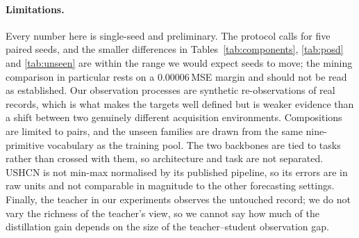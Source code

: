 \paragraph{Limitations.}
Every number here is single-seed and preliminary. The protocol calls for five paired seeds, and the smaller
differences in Tables~\ref{tab:components}, \ref{tab:posd} and \ref{tab:unseen} are within the range we would
expect seeds to move; the mining comparison in particular rests on a $0.00006$\,MSE margin and should not be read
as established. Our observation processes are synthetic re-observations of real records, which is what makes the
targets well defined but is weaker evidence than a shift between two genuinely different acquisition environments.
Compositions are limited to pairs, and the unseen families are drawn from the same nine-primitive vocabulary as the
training pool. The two backbones are tied to tasks rather than crossed with them, so architecture and task are not
separated. USHCN is not min-max normalised by its published pipeline, so its errors are in raw units and not
comparable in magnitude to the other forecasting settings. Finally, the teacher in our experiments observes the
untouched record; we do not vary the richness of the teacher's view, so we cannot say how much of the distillation
gain depends on the size of the teacher--student observation gap.
